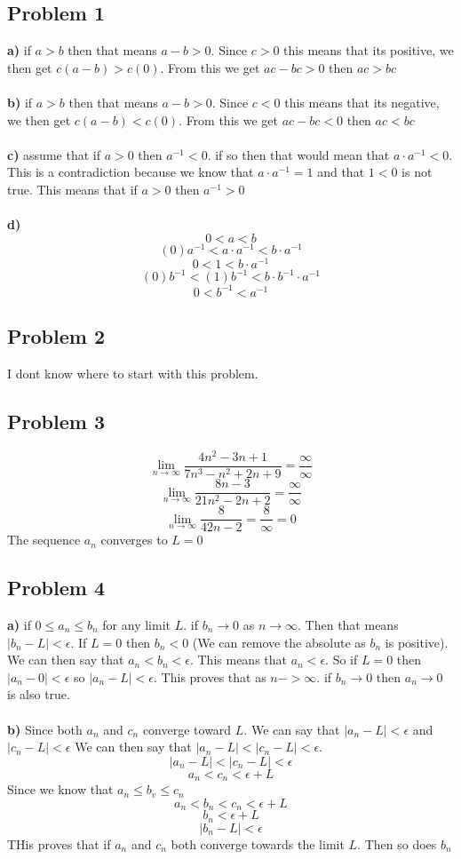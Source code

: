 \documentclass[12pt]{article}
\begin{document}
\subsection*{Problem 1}
\textbf{a)} if $a > b$ then that means $a - b > 0$. Since $c > 0$ this means that its positive, we then get $c(a - b) > c(0)$. From this we get $ac - bc > 0$ then $ac > bc$ \\\\
\textbf{b)} if $a > b$ then that means $a - b > 0$. Since $c < 0$ this means that its negative, we then get $c(a - b) < c(0)$. From this we get $ac - bc < 0$ then $ac < bc$ \\\\
\textbf{c)} assume that if $a > 0$ then $a^{-1} < 0$. if so then that would mean that $a \cdot a^{-1} < 0$. This is a contradiction because we know that $a \cdot a^{-1} = 1$ and that $1 < 0$ is not true. This means that if $a > 0$ then $a^{-1} > 0$ \\\\
\textbf{d)} 
\[ 0 < a < b \]
\[ (0)a^{-1} < a \cdot a^{-1} < b \cdot a^{-1} \]
\[ 0 < 1 < b \cdot a^{-1} \]
\[ (0)b^{-1} < (1)b^{-1} < b \cdot b^{-1} \cdot a^{-1} \]
\[ 0 < b^{-1} < a^{-1} \]
\subsection*{Problem 2}
I dont know where to start with this problem.
\subsection*{Problem 3}
\[ \lim_{n \to \infty} \frac{4n^2 - 3n + 1}{7n^3 - n^2 + 2n + 9} = \frac{\infty}{\infty}\]
\[ \lim_{n \to \infty} \frac{8n - 3}{21n^2 - 2n + 2} = \frac{\infty}{\infty}\]
\[ \lim_{n \to \infty} \frac{8}{42n - 2} = \frac{8}{\infty} = 0 \]
The sequence $a_n$ converges to $L= 0$
\newpage
\subsection*{Problem 4}
\textbf{a)} if $0 \leq a_n \leq b_n$ for any limit $L$. if $b_n \rightarrow 0$ as $n \rightarrow \infty$. Then that means $|b_n - L| < \epsilon$. If $L = 0$ then $b_n < 0$ (We can remove the absolute as $b_n$ is positive). We can then say that $a_n < b_n < \epsilon$. This means that $a_n <  \epsilon$. So if $L = 0$ then $|a_n - 0| < \epsilon$ so $|a_n - L| < \epsilon$. This proves that as $n -> \infty$. if $b_n \rightarrow 0$ then $a_n \rightarrow 0$ is also true.\\\\
\textbf{b)} Since both $a_n$ and $c_n$ converge toward $L$. We can say that $|a_n - L| < \epsilon$ and $|c_n - L| < \epsilon$
We can then say that $|a_n - L| < |c_n - L| < \epsilon$.
\[ |a_n - L| < |c_n - L| < \epsilon \]
\[ a_n < c_n < \epsilon + L\]
Since we know that $a_n \leq b_v \leq c_n$
\[ a_n < b_n < c_n < \epsilon + L\]
\[ b_n < \epsilon + L\]
\[ |b_n - L| < \epsilon\]
THis proves that if $a_n$ and $c_n$ both converge towards the limit $L$. Then so does $b_n$
\end{document}
